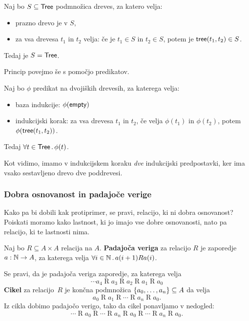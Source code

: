 \begin{definicija}
  Naj bo $S \subseteq \mathsf{Tree}$ podmnožica dreves, za katero velja:
  \begin{itemize}
  \item prazno drevo je v $S$,
  \item za vsa drevesa $t_1$ in $t_2$ velja: če je $t_1 \in S$ in $t_2 \in S$, potem je $\mathsf{tree}(t_1, t_2) \in S$.
  \end{itemize}
  Tedaj je $S = \mathsf{Tree}$.
\end{definicija}

Princip povejmo še s pomočjo predikatov.

\begin{definicija}
  Naj bo $\phi$ predikat na dvojiških drevesih, za katerega velja:
  \begin{itemize}
  \item baza indukcije: $\phi(\mathsf{empty})$
  \item indukcijski korak: za vsa drevesa $t_1$ in $t_2$, če velja $\phi(t_1)$ in $\phi(t_2)$, potem
    $\phi(\mathsf{tree}(t_1, t_2))$.
  \end{itemize}
  Tedaj $\forall t \in \mathsf{Tree} \,.\, \phi(t)$.
\end{definicija}

Kot vidimo, imamo v indukcijskem koraku \emph{dve} indukcijski predpostavki, ker ima vsako
sestavljeno drevo dve poddrevesi.


\subsubsection{Dobra osnovanost in padajoče verige}

Kako pa bi dobili kak protiprimer, se pravi, relacijo, ki ni dobra osnovanost? Poiskati
moramo kako lastnost, ki jo imajo vse dobre osnovanosti, nato pa relacijo, ki te lastnosti nima.

\begin{definicija}
  Naj bo $R \subseteq A \times A$ relacija na $A$. \textbf{Padajoča veriga} za relacijo $R$
  je zaporedje $a : \mathbb{N} \to A$, za katerega velja $\forall i \in \mathbb{N} \,.\, a(i+1) R a(i)$.
\end{definicija}

Se pravi, da je padajoča veriga zaporedje, za katerega velja
%
\begin{equation*}
  \cdots a_4 \mathrel{R} a_3 \mathrel{R} a_2 \mathrel{R} a_1 \mathrel{R} a_0
\end{equation*}
%
\textbf{Cikel} za relacijo~$R$ je končna podmnožica $\left\{a_0, \ldots, a_n\right\} \subseteq A$ da velja
%
\begin{equation*}
  a_0 \mathrel{R} a_1 \mathrel{R} \cdots \mathrel{R} a_n \mathrel{R} a_0.
\end{equation*}
%
Iz cikla dobimo padajočo verigo, tako da cikel ponavljamo v nedogled:
%
\begin{equation*}
  \cdots \mathrel{R} a_0 \mathrel{R} \cdots \mathrel{R} a_n
         \mathrel{R} a_0 \mathrel{R} \cdots \mathrel{R} a_n \mathrel{R} a_0.
\end{equation*}

